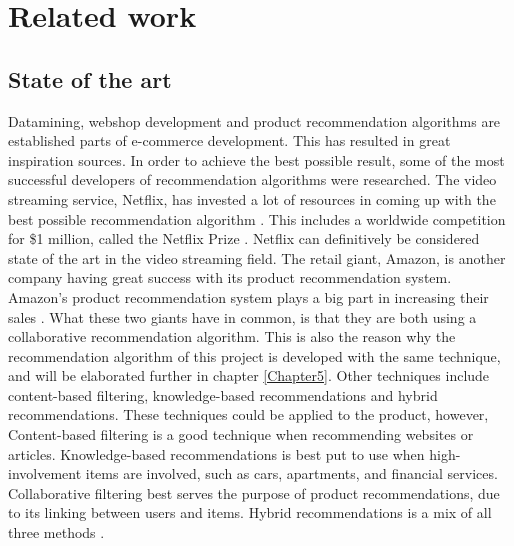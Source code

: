 
\chapter{Related work} %

\label{Chapter3} %


\section{State of the art}

Datamining, webshop development and product recommendation algorithms are established parts of e-commerce development. This has resulted in great inspiration sources. In order to achieve the best possible result, some of the most successful developers of recommendation algorithms were researched. The video streaming service, Netflix, has invested a lot of resources in coming up with the best possible recommendation algorithm \cite{Netflix}. This includes a worldwide competition for \$1 million, called the Netflix Prize \cite{NetflixPrize}. Netflix can definitively be considered state of the art in the video streaming field. The retail giant, Amazon, is another company having great success with its product recommendation system. Amazon's product recommendation system plays a big part in increasing their sales \cite{AmazonSuccess}. What these two giants have in common, is that they are both using a collaborative recommendation algorithm. This is also the reason why the recommendation algorithm of this project is developed with the same technique, and will be elaborated further in chapter \ref{Chapter5}. Other techniques include content-based filtering, knowledge-based recommendations and hybrid recommendations. These techniques could be applied to the product, however, Content-based filtering is a good technique when recommending websites or articles. Knowledge-based recommendations is best put to use when high-involvement items are involved, such as cars, apartments, and financial services. Collaborative filtering best serves the purpose of product recommendations, due to its linking between users and items. Hybrid recommendations is a mix of all three methods \cite{recommendationtechniques}.


